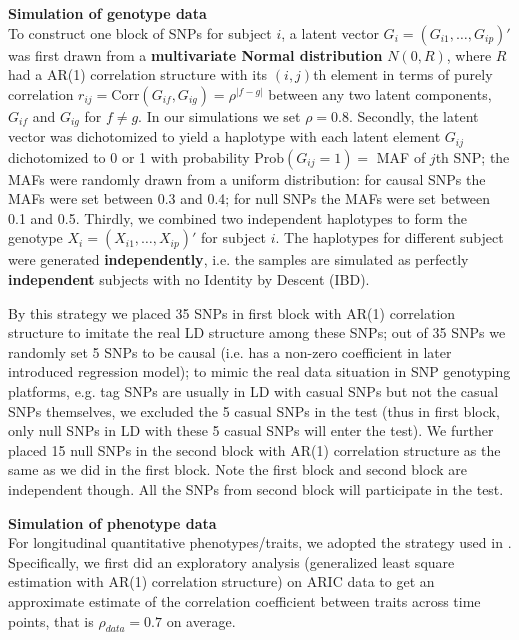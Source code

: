 \documentclass[12pt]{article}
\begin{document}
\textbf{Simulation of genotype data}\\
To construct one block of SNPs for subject $i$, a latent vector $G_i = (G_{i1}, \ldots, G_{ip})'$ was first drawn from a \textbf{multivariate Normal distribution} $N(0,R)$, where $R$ had a AR(1) correlation structure with its $(i,j)$th element in terms of purely correlation $r_{ij} =\textrm{Corr} (G_{if}, G_{ig}) = \rho ^ { |f - g| }$ between any two latent components, $G_{if}$ and $G_{ig}$ for $f \neq g$. In our simulations we set $\rho = 0.8$. Secondly, the latent vector was dichotomized to yield a haplotype with each latent element $G_{ij}$ dichotomized to 0 or 1 with probability $\textrm{Prob} (G_{ij} = 1) = $ MAF of $j$th SNP; the MAFs were randomly drawn from a uniform distribution: for causal SNPs the MAFs were set between 0.3 and 0.4; for null SNPs the MAFs were set between 0.1 and 0.5. Thirdly, we combined two independent haplotypes to form the genotype $X_i = (X_{i1}, \ldots, X_{ip})' $ for subject $i$. The haplotypes for different subject were generated \textbf{independently}, i.e. the samples are simulated as perfectly \textbf{independent} subjects with no Identity by Descent (IBD). 

By this strategy we placed 35 SNPs in first block with AR(1) correlation structure to imitate the real LD structure among these SNPs; out of 35 SNPs we randomly set 5 SNPs to be causal (i.e. has a non-zero coefficient in later introduced regression model); to mimic the real data situation in SNP genotyping platforms, e.g. tag SNPs are usually in LD with casual SNPs but not the casual SNPs themselves, we excluded the 5 casual SNPs in the test (thus in first block, only null SNPs in LD with these 5 casual SNPs will enter the test). We further placed 15 null SNPs in the second block with AR(1) correlation structure as the same as we did in the first block. Note the first block and second block are independent though. All the SNPs from second block will participate in the test.

\textbf{Simulation of phenotype data}\\
For longitudinal quantitative phenotypes/traits, we adopted the strategy used in \cite{Song2013}. Specifically, we first did an exploratory analysis (generalized least square estimation with AR(1) correlation structure) on ARIC data to get an approximate estimate of the correlation coefficient between traits across time points, that is $\rho_{data} = 0.7$ on average. 
\end{document}
